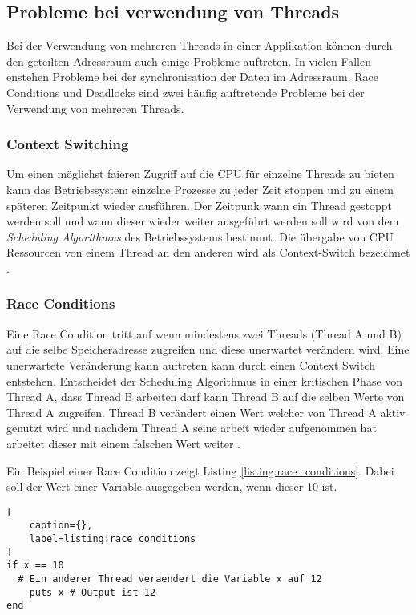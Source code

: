 \subsection{Probleme bei verwendung von Threads}
Bei der Verwendung von mehreren Threads in einer Applikation können durch den geteilten Adressraum auch einige Probleme auftreten. In vielen Fällen enstehen Probleme bei der synchronisation der Daten im Adressraum. Race Conditions und Deadlocks sind zwei häufig auftretende Probleme bei der Verwendung von mehreren Threads. 

\subsubsection{Context Switching}
Um einen möglichst faieren Zugriff auf die CPU für einzelne Threads zu bieten kann das Betriebssystem einzelne Prozesse zu jeder Zeit stoppen und zu einem späteren Zeitpunkt wieder ausführen. Der Zeitpunk wann ein Thread gestoppt werden soll und wann dieser wieder weiter ausgeführt werden soll wird von dem \emph{Scheduling Algorithmus} des Betriebssystems bestimmt. Die übergabe von CPU Ressourcen von einem Thread an den anderen wird als Context-Switch bezeichnet \cite[p. 23]{Sto2013}.

\subsubsection{Race Conditions}

Eine Race Condition tritt auf wenn mindestens zwei Threads (Thread A und B) auf die selbe Speicheradresse zugreifen und diese unerwartet verändern wird. Eine unerwartete Veränderung kann auftreten kann durch einen Context Switch entstehen. Entscheidet der Scheduling Algorithmus in einer kritischen Phase von Thread A, dass Thread B arbeiten darf kann Thread B auf die selben Werte von Thread A zugreifen. Thread B verändert einen Wert welcher von Thread A aktiv genutzt wird und nachdem Thread A seine arbeit wieder aufgenommen hat arbeitet dieser mit einem falschen Wert weiter \cite[p. 89]{tan09}. 

Ein Beispiel einer Race Condition zeigt Listing \ref{listing:race_conditions}. Dabei soll der Wert einer Variable ausgegeben werden, wenn dieser 10 ist.

\begin{lstlisting}[
	caption={},
	label=listing:race_conditions
]
if x == 10
  # Ein anderer Thread veraendert die Variable x auf 12
	puts x # Output ist 12 
end
\end{lstlisting}

